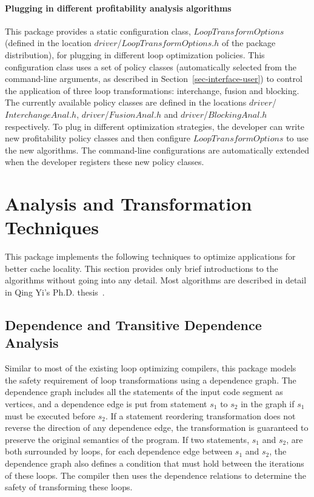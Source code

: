 \paragraph {Plugging in different profitability analysis algorithms}
This package provides a static configuration class, $LoopTransformOptions$
(defined in the location 
$driver$/$LoopTransformOptions.h$ of the package distribution), 
for plugging in different loop optimization policies.
This configuration class uses a set of policy classes 
(automatically selected from the command-line arguments, as 
described in Section~\ref {sec-interface-user})
to control
the application of three loop transformations: interchange, fusion and blocking.
The currently available policy classes
are defined in the locations $driver$/$InterchangeAnal.h$,
$driver$/$FusionAnal.h$ and $driver$/$BlockingAnal.h$ respectively.
To plug in different optimization strategies,
the developer can write new profitability policy classes
and then configure $LoopTransformOptions$ to use 
the new algorithms.  
The command-line configurations are automatically
extended when the developer registers these new policy classes.

\section {Analysis and Transformation Techniques}
This package implements the following techniques to 
optimize applications for better cache locality.
This section provides only brief introductions to the
algorithms without going into any detail.
Most algorithms are described in detail in Qing Yi's Ph.D.
thesis~\cite{MyThesis}.

\subsection {Dependence and Transitive Dependence Analysis}
Similar to most of the existing  loop optimizing compilers, 
this package models the safety requirement of loop transformations
using a dependence graph. The dependence graph includes all the statements of 
the input code segment as vertices, and a dependence edge is put from
statement $s_1$ to $s_2$ in the graph if $s_1$ must be executed
before $s_2$. If a statement reordering transformation does not 
reverse the direction of any dependence edge, the transformation
is guaranteed to preserve the original semantics of the program.
If two statements, $s_1$ and $s_2$, are both surrounded by loops,
for each dependence edge between $s_1$ and $s_2$, 
the dependence graph also defines a condition that must hold
between the iterations of these loops. 
The compiler then uses the dependence
relations to determine the safety of transforming these loops.


